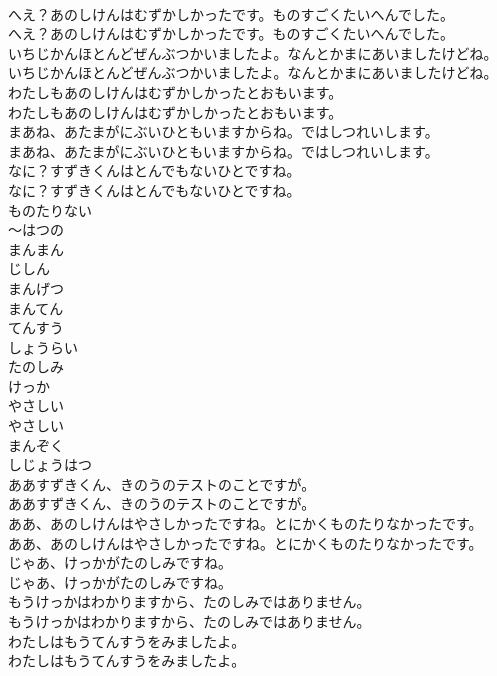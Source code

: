 \documentclass[8pt]{extreport}
\begin{document}
\begin{CJK}{UTF8}{min}
\\	へえ？あのしけんはむずかしかったです。ものすごくたいへんでした。	
\\	へえ？あのしけんはむずかしかったです。ものすごくたいへんでした。 
\\	いちじかんほとんどぜんぶつかいましたよ。なんとかまにあいましたけどね。	
\\	いちじかんほとんどぜんぶつかいましたよ。なんとかまにあいましたけどね。 
\\	わたしもあのしけんはむずかしかったとおもいます。	
\\	わたしもあのしけんはむずかしかったとおもいます。 
\\	まあね、あたまがにぶいひともいますからね。ではしつれいします。	
\\	まあね、あたまがにぶいひともいますからね。ではしつれいします。 
\\	なに？すずきくんはとんでもないひとですね。	
\\	なに？すずきくんはとんでもないひとですね。 
\\	ものたりない
\\	〜はつの
\\	まんまん
\\	じしん
\\	まんげつ
\\	まんてん
\\	てんすう
\\	しょうらい
\\	たのしみ
\\	けっか
\\	やさしい
\\	やさしい
\\	まんぞく
\\	しじょうはつ
\\	ああすずきくん、きのうのテストのことですが。	
\\	ああすずきくん、きのうのテストのことですが。 
\\	ああ、あのしけんはやさしかったですね。とにかくものたりなかったです。	
\\	ああ、あのしけんはやさしかったですね。とにかくものたりなかったです。 
\\	じゃあ、けっかがたのしみですね。	
\\	じゃあ、けっかがたのしみですね。 
\\	もうけっかはわかりますから、たのしみではありません。	
\\	もうけっかはわかりますから、たのしみではありません。 
\\	わたしはもうてんすうをみましたよ。	
\\	わたしはもうてんすうをみましたよ。 

\end{CJK}
\end{document}
